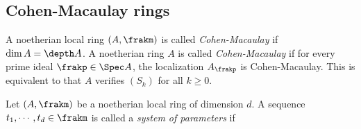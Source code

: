         


\subsection{Cohen-Macaulay rings}

    \begin{definition}\label{def: Cohen-Macaulay}
        A noetherian local ring $(A,\frakm)$ is called \textit{Cohen-Macaulay} if $\dim A = \depth A$.
        A noetherian ring $A$ is called \textit{Cohen-Macaulay} if for every prime ideal $\frakp \in \Spec A$, the localization $A_\frakp$ is Cohen-Macaulay.
        This is equivalent to that \(A\) verifies $(S_k)$ for all \(k \geq 0\).
    \end{definition}

    \begin{definition}\label{def:system_of_parameters}
        Let $(A,\frakm)$ be a noetherian local ring of dimension $d$.
        A sequence $t_1,\cdots,t_d \in \frakm$ is called a \textit{system of parameters} if
    \end{definition}

    \begin{example}
    \end{example}

